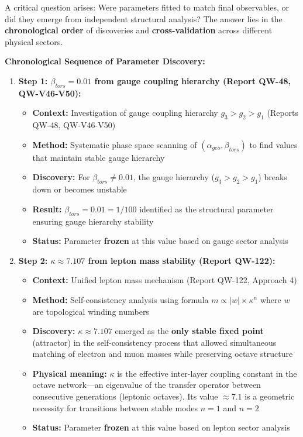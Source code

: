 \documentclass[11pt, a4paper]{article}
\begin{document}
A critical question arises: Were parameters fitted to match final observables, or did they emerge from independent structural analysis? The answer lies in the \textbf{chronological order} of discoveries and \textbf{cross-validation} across different physical sectors.

\textbf{Chronological Sequence of Parameter Discovery:}

\begin{enumerate}
    \item \textbf{Step 1: $\beta_{tors} = 0.01$ from gauge coupling hierarchy (Report QW-48, QW-V46-V50):}
    \begin{itemize}
        \item \textbf{Context:} Investigation of gauge coupling hierarchy $g_3 > g_2 > g_1$ (Reports QW-48, QW-V46-V50)
        \item \textbf{Method:} Systematic phase space scanning of $(\alpha_{geo}, \beta_{tors})$ to find values that maintain stable gauge hierarchy
        \item \textbf{Discovery:} For $\beta_{tors} \neq 0.01$, the gauge hierarchy ($g_3 > g_2 > g_1$) breaks down or becomes unstable
        \item \textbf{Result:} $\beta_{tors} = 0.01 = 1/100$ identified as the structural parameter ensuring gauge hierarchy stability
        \item \textbf{Status:} Parameter \textbf{frozen} at this value based on gauge sector analysis
    \end{itemize}

    \item \textbf{Step 2: $\kappa \approx 7.107$ from lepton mass stability (Report QW-122):}
    \begin{itemize}
        \item \textbf{Context:} Unified lepton mass mechanism (Report QW-122, Approach 4)
        \item \textbf{Method:} Self-consistency analysis using formula $m \propto |w| \times \kappa^n$ where $w$ are topological winding numbers
        \item \textbf{Discovery:} $\kappa \approx 7.107$ emerged as the \textbf{only stable fixed point} (attractor) in the self-consistency process that allowed simultaneous matching of electron and muon masses while preserving octave structure
        \item \textbf{Physical meaning:} $\kappa$ is the effective inter-layer coupling constant in the octave network—an eigenvalue of the transfer operator between consecutive generations (leptonic octaves). Its value $\approx 7.1$ is a geometric necessity for transitions between stable modes $n=1$ and $n=2$
        \item \textbf{Status:} Parameter \textbf{frozen} at this value based on lepton sector analysis
    \end{itemize}


\end{enumerate}
\end{document}
